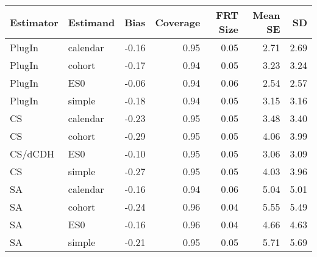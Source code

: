 \captionsetup[table]{labelformat=empty,skip=1pt}
\begin{longtable}{llrrrrr}
\toprule
Estimator & Estimand & Bias & Coverage & FRT Size & Mean SE & SD \\ 
\midrule
PlugIn & calendar & -0.16 & 0.95 & 0.05 & 2.71 & 2.69 \\ 
PlugIn & cohort & -0.17 & 0.94 & 0.05 & 3.23 & 3.24 \\ 
PlugIn & ES0 & -0.06 & 0.94 & 0.06 & 2.54 & 2.57 \\ 
PlugIn & simple & -0.18 & 0.94 & 0.05 & 3.15 & 3.16 \\ 
CS & calendar & -0.23 & 0.95 & 0.05 & 3.48 & 3.40 \\ 
CS & cohort & -0.29 & 0.95 & 0.05 & 4.06 & 3.99 \\ 
CS/dCDH & ES0 & -0.10 & 0.95 & 0.05 & 3.06 & 3.09 \\ 
CS & simple & -0.27 & 0.95 & 0.05 & 4.03 & 3.96 \\ 
SA & calendar & -0.16 & 0.94 & 0.06 & 5.04 & 5.01 \\ 
SA & cohort & -0.24 & 0.96 & 0.04 & 5.55 & 5.49 \\ 
SA & ES0 & -0.16 & 0.96 & 0.04 & 4.66 & 4.63 \\ 
SA & simple & -0.21 & 0.95 & 0.05 & 5.71 & 5.69 \\ 
 \bottomrule
\end{longtable}

